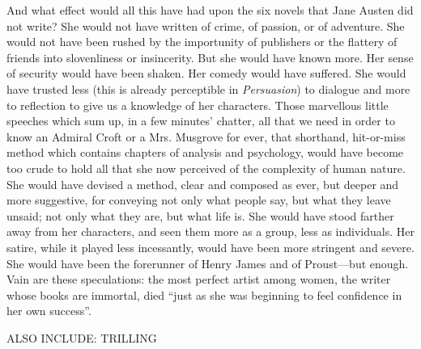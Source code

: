 And what effect would all this have had upon the six novels that Jane Austen did not write? She would not have written of crime, of passion, or of adventure. She would not have been rushed by the importunity of publishers or the flattery of friends into slovenliness or insincerity. But she would have known more. Her sense of security would have been shaken. Her comedy would have suffered. She would have trusted less (this is already perceptible in \textit{Persuasion}) to dialogue and more to reflection to give us a knowledge of her characters. Those marvellous little speeches which sum up, in a few minutes' chatter, all that we need in order to know an Admiral Croft or a Mrs. Musgrove for ever, that shorthand, hit-or-miss method which contains chapters of analysis and psychology, would have become too crude to hold all that she now perceived of the complexity of human nature. She would have devised a method, clear and composed as ever, but deeper and more suggestive, for conveying not only what people say, but what they leave unsaid; not only what they are, but what life is. She would have stood farther away from her characters, and seen them more as a group, less as individuals. Her satire, while it played less incessantly, would have been more stringent and severe. She would have been the forerunner of Henry James and of Proust—but enough. Vain are these speculations: the most perfect artist among women, the writer whose books are immortal, died ``just as she was beginning to feel confidence in her own success''.



ALSO INCLUDE: TRILLING
